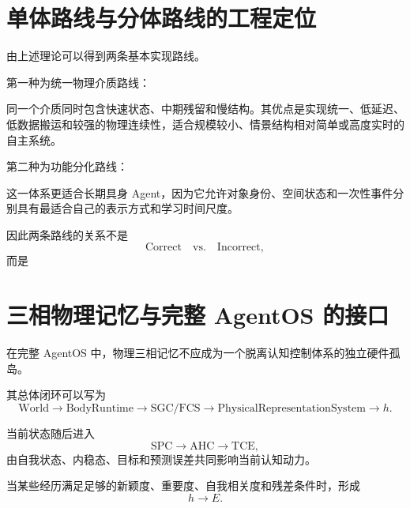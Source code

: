 \section{单体路线与分体路线的工程定位}

由上述理论可以得到两条基本实现路线。

第一种为统一物理介质路线：
\begin{statementbox}
\centering
{}
\end{statementbox}

同一个介质同时包含快速状态、中期残留和慢结构。其优点是实现统一、低延迟、低数据搬运和较强的物理连续性，适合规模较小、情景结构相对简单或高度实时的自主系统。

第二种为功能分化路线：
\begin{statementbox}
\centering
{}
\end{statementbox}

这一体系更适合长期具身 Agent，因为它允许对象身份、空间状态和一次性事件分别具有最适合自己的表示方式和学习时间尺度。

因此两条路线的关系不是
\[
\mathrm{Correct}
\quad\mathrm{vs.}\quad
\mathrm{Incorrect},
\]
而是
\begin{statementbox}
\centering
{}
\end{statementbox}

\section{三相物理记忆与完整 AgentOS 的接口}

在完整 AgentOS 中，物理三相记忆不应成为一个脱离认知控制体系的独立硬件孤岛。

其总体闭环可以写为
\[
\mathrm{World}
\rightarrow
\mathrm{BodyRuntime}
\rightarrow
\mathrm{SGC/FCS}
\rightarrow
\mathrm{PhysicalRepresentationSystem}
\rightarrow
h.
\]

当前状态随后进入
\[
\mathrm{SPC}
\rightarrow
\mathrm{AHC}
\rightarrow
\mathrm{TCE},
\]
由自我状态、内稳态、目标和预测误差共同影响当前认知动力。

当某些经历满足足够的新颖度、重要度、自我相关度和残差条件时，形成
\[
h\rightarrow E.
\]

